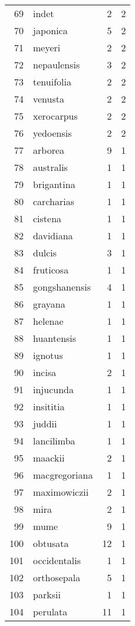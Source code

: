 \documentclass{article}\usepackage[]{graphicx}\usepackage[]{color}
\begin{document}
\begin{table}[ht]
\begin{tabular}{rlrr}
  69 & indet &   2 &   2 \\ 
  70 & japonica &   5 &   2 \\ 
  71 & meyeri &   2 &   2 \\ 
  72 & nepaulensis &   3 &   2 \\ 
  73 & tenuifolia &   2 &   2 \\ 
  74 & venusta &   2 &   2 \\ 
  75 & xerocarpus &   2 &   2 \\ 
  76 & yedoensis &   2 &   2 \\ 
  77 & arborea &   9 &   1 \\ 
  78 & australis &   1 &   1 \\ 
  79 & brigantina &   1 &   1 \\ 
  80 & carcharias &   1 &   1 \\ 
  81 & cistena &   1 &   1 \\ 
  82 & davidiana &   1 &   1 \\ 
  83 & dulcis &   3 &   1 \\ 
  84 & fruticosa &   1 &   1 \\ 
  85 & gongshanensis &   4 &   1 \\ 
  86 & grayana &   1 &   1 \\ 
  87 & helenae &   1 &   1 \\ 
  88 & huantensis &   1 &   1 \\ 
  89 & ignotus &   1 &   1 \\ 
  90 & incisa &   2 &   1 \\ 
  91 & injucunda &   1 &   1 \\ 
  92 & insititia &   1 &   1 \\ 
  93 & juddii &   1 &   1 \\ 
  94 & lancilimba &   1 &   1 \\ 
  95 & maackii &   2 &   1 \\ 
  96 & macgregoriana &   1 &   1 \\ 
  97 & maximowiczii &   2 &   1 \\ 
  98 & mira &   2 &   1 \\ 
  99 & mume &   9 &   1 \\ 
  100 & obtusata &  12 &   1 \\ 
  101 & occidentalis &   1 &   1 \\ 
  102 & orthosepala &   5 &   1 \\ 
  103 & parksii &   1 &   1 \\ 
  104 & perulata &  11 &   1 \\ 

\end{tabular}
\end{table}
\end{document}
